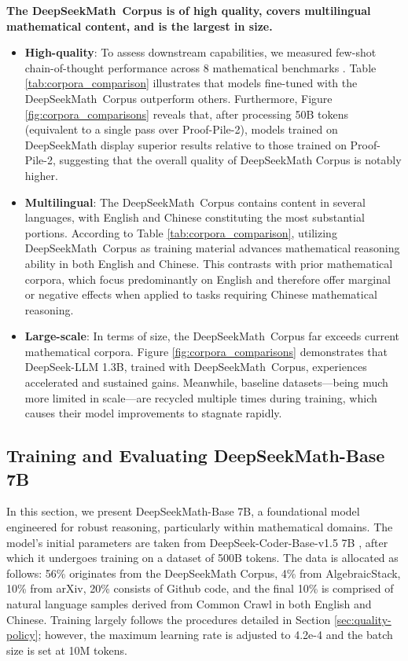 \begin{itemize}[topsep=0pt]
\textbf{The DeepSeekMath~Corpus is of high quality, covers multilingual mathematical content, and is the largest in size.}

\begin{itemize}[topsep=0pt]
    \item \textbf{High-quality}:
    To assess downstream capabilities, we measured few-shot chain-of-thought performance across 8 mathematical benchmarks \cite{cot}. Table \ref{tab:corpora_comparison} illustrates that models fine-tuned with the DeepSeekMath~Corpus outperform others. Furthermore, Figure \ref{fig:corpora_comparisons} reveals that, after processing 50B tokens (equivalent to a single pass over Proof-Pile-2), models trained on DeepSeekMath display superior results relative to those trained on Proof-Pile-2, suggesting that the overall quality of DeepSeekMath Corpus is notably higher.
    \item \textbf{Multilingual}:
    The DeepSeekMath~Corpus contains content in several languages, with English and Chinese constituting the most substantial portions. According to Table \ref{tab:corpora_comparison}, utilizing DeepSeekMath~Corpus as training material advances mathematical reasoning ability in both English and Chinese. This contrasts with prior mathematical corpora, which focus predominantly on English and therefore offer marginal or negative effects when applied to tasks requiring Chinese mathematical reasoning.
    \item \textbf{Large-scale}:
    In terms of size, the DeepSeekMath~Corpus far exceeds current mathematical corpora. Figure \ref{fig:corpora_comparisons} demonstrates that DeepSeek-LLM 1.3B, trained with DeepSeekMath~Corpus, experiences accelerated and sustained gains. Meanwhile, baseline datasets—being much more limited in scale—are recycled multiple times during training, which causes their model improvements to stagnate rapidly.
\end{itemize}

\subsection{Training and Evaluating DeepSeekMath-Base 7B}

In this section, we present DeepSeekMath-Base 7B, a foundational model engineered for robust reasoning, particularly within mathematical domains. The model’s initial parameters are taken from DeepSeek-Coder-Base-v1.5 7B \citep{deepseek-coder}, after which it undergoes training on a dataset of 500B tokens. The data is allocated as follows: 56\% originates from the DeepSeekMath Corpus, 4\% from AlgebraicStack, 10\% from arXiv, 20\% consists of Github code, and the final 10\% is comprised of natural language samples derived from Common Crawl in both English and Chinese. Training largely follows the procedures detailed in Section \ref{sec:quality-policy}; however, the maximum learning rate is adjusted to 4.2e-4 and the batch size is set at 10M tokens.


\end{itemize}
